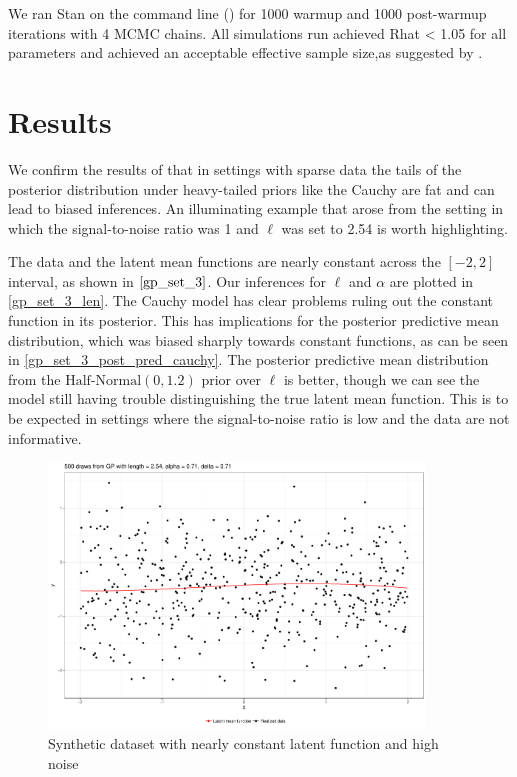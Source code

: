 \documentclass{article}
\begin{document}
We ran Stan on the command line (\citet{cmdstan}) for 1000 warmup and 1000
post-warmup iterations with 4 MCMC chains. All simulations run achieved Rhat <
1.05 for all parameters and achieved an acceptable effective sample size,as
suggested by \citet{gelman2014bayesian}.

\section{Results} \label{results}

We confirm the results of \citet{fuglstad2015interpretable} that in settings
with sparse data the tails of the posterior distribution under heavy-tailed
priors like the Cauchy are fat and can lead to biased inferences. An
illuminating example that arose from the setting in which the signal-to-noise
ratio was 1 and $\ell$ was set to 2.54 is worth highlighting.

The data and the latent mean functions are nearly constant across the $[-2,2]$
interval, as shown in $\ref{gp_set_3}$. Our inferences for $\ell$ and $\alpha$
are plotted in \ref{gp_set_3_len}. The Cauchy model has clear problems ruling
out the constant function in its posterior. This has implications for the 
posterior predictive mean distribution, which was biased sharply towards
constant functions, as can be seen in \ref{gp_set_3_post_pred_cauchy}. The
posterior predictive mean distribution from the $\text{Half-Normal}(0, 1.2)$
prior over $\ell$ is better, though we can see the model still having trouble
distinguishing the true latent mean function. This is to be expected in settings
where the signal-to-noise ratio is low and the data are not informative.

\begin{figure}[h] \label{gp_set_3}
  \centering
  \includegraphics[width=100mm]{plots/dset_3_dgp.pdf}
  \caption{Synthetic dataset with nearly constant latent function and high noise}
\end{figure}
\end{document}
